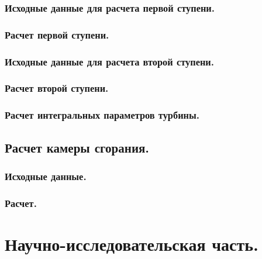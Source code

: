 \documentclass[a4paper,12pt]{article}
\begin{document}
    \subsubsection{Исходные данные для расчета первой ступени.}
    \subsubsection{Расчет первой ступени.}
    \subsubsection{Исходные данные для расчета второй ступени.}
    \subsubsection{Расчет второй ступени.}
    \subsubsection{Расчет интегральных параметров турбины.}

    \subsection{Расчет камеры сгорания.}

    \subsubsection{Исходные данные.}
    \subsubsection{Расчет.}

    \section{Научно-исследовательская часть.}
\end{document}
